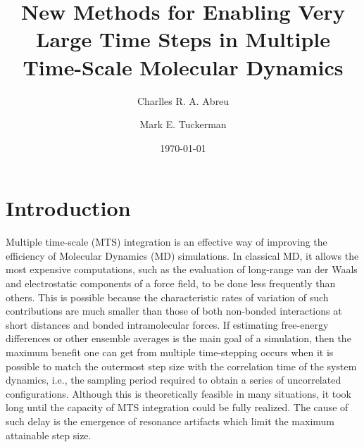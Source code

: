 \documentclass[
aip,
jcp,
reprint,
]{revtex4-1}
\begin{document}
\author{Charlles R. A. Abreu}

\author{Mark E. Tuckerman}

\title{New Methods for Enabling Very Large Time Steps in Multiple Time-Scale Molecular Dynamics}


\date{\today}

\maketitle

\section{Introduction}

Multiple time-scale (MTS) integration \cite{Grubmuller_1991, Tuckerman_1992, Martyna_1996} is an effective way of improving the efficiency of Molecular Dynamics (MD) simulations.
In classical MD, it allows the most expensive computations, such as the evaluation of long-range van der Waals and electrostatic components of a force field, to be done less frequently than others.
This is possible because the characteristic rates of variation of such contributions are much smaller than those of both non-bonded interactions at short distances and bonded intramolecular forces.
If estimating free-energy differences or other ensemble averages is the main goal of a simulation, then the maximum benefit one can get from multiple time-stepping occurs when it is possible to match the outermost step size with the correlation time of the system dynamics, i.e., the sampling period required to obtain a series of uncorrelated configurations.
Although this is theoretically feasible in many situations, it took long until the capacity of MTS integration could be fully realized.
The cause of such delay is the emergence of resonance artifacts \cite{Biesiadecki_1993, Schlick_1998a, Ma_2003} which limit the maximum attainable step size.
\end{document}
